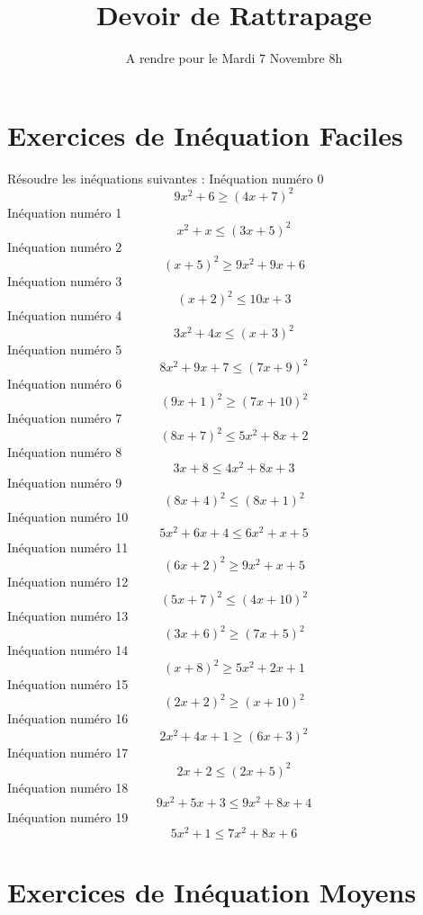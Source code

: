 \documentclass{article}
\title{Devoir de Rattrapage}
\date{A rendre pour le Mardi 7 Novembre 8h}\usepackage{natbib}
\begin{document}
\maketitle
 \section{Exercices de In\'equation Faciles}

 R\'esoudre les in\'equations suivantes : 
In\'equation num\'ero 0 \[9 x^{2} + 6 \geq \left(4 x + 7\right)^{2}\]In\'equation num\'ero 1 \[x^{2} + x \leq \left(3 x + 5\right)^{2}\]In\'equation num\'ero 2 \[\left(x + 5\right)^{2} \geq 9 x^{2} + 9 x + 6\]In\'equation num\'ero 3 \[\left(x + 2\right)^{2} \leq 10 x + 3\]In\'equation num\'ero 4 \[3 x^{2} + 4 x \leq \left(x + 3\right)^{2}\]In\'equation num\'ero 5 \[8 x^{2} + 9 x + 7 \leq \left(7 x + 9\right)^{2}\]In\'equation num\'ero 6 \[\left(9 x + 1\right)^{2} \geq \left(7 x + 10\right)^{2}\]In\'equation num\'ero 7 \[\left(8 x + 7\right)^{2} \leq 5 x^{2} + 8 x + 2\]In\'equation num\'ero 8 \[3 x + 8 \leq 4 x^{2} + 8 x + 3\]In\'equation num\'ero 9 \[\left(8 x + 4\right)^{2} \leq \left(8 x + 1\right)^{2}\]In\'equation num\'ero 10 \[5 x^{2} + 6 x + 4 \leq 6 x^{2} + x + 5\]In\'equation num\'ero 11 \[\left(6 x + 2\right)^{2} \geq 9 x^{2} + x + 5\]In\'equation num\'ero 12 \[\left(5 x + 7\right)^{2} \leq \left(4 x + 10\right)^{2}\]In\'equation num\'ero 13 \[\left(3 x + 6\right)^{2} \geq \left(7 x + 5\right)^{2}\]In\'equation num\'ero 14 \[\left(x + 8\right)^{2} \geq 5 x^{2} + 2 x + 1\]In\'equation num\'ero 15 \[\left(2 x + 2\right)^{2} \geq \left(x + 10\right)^{2}\]In\'equation num\'ero 16 \[2 x^{2} + 4 x + 1 \geq \left(6 x + 3\right)^{2}\]In\'equation num\'ero 17 \[2 x + 2 \leq \left(2 x + 5\right)^{2}\]In\'equation num\'ero 18 \[9 x^{2} + 5 x + 3 \leq 9 x^{2} + 8 x + 4\]In\'equation num\'ero 19 \[5 x^{2} + 1 \leq 7 x^{2} + 8 x + 6\]
 \section{Exercices de In\'equation Moyens}
\end{document}
